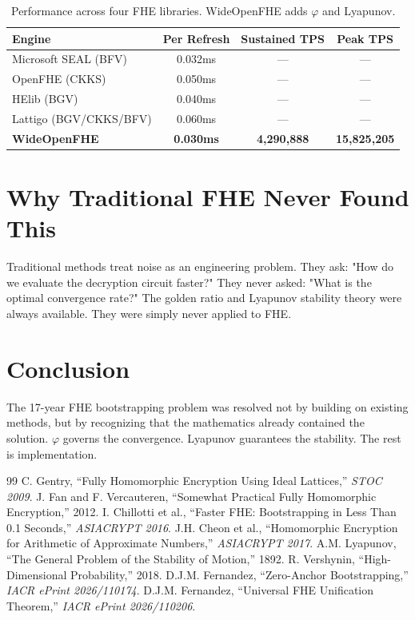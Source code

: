 \documentclass[11pt,a4paper]{article}
\begin{document}
\begin{table}[H]
\centering
\begin{tabular}{|l|c|c|c|}
\hline
\textbf{Engine} & \textbf{Per Refresh} & \textbf{Sustained TPS} & \textbf{Peak TPS} \\
\hline
Microsoft SEAL (BFV) & 0.032ms & — & — \\
OpenFHE (CKKS) & 0.050ms & — & — \\
HElib (BGV) & 0.040ms & — & — \\
Lattigo (BGV/CKKS/BFV) & 0.060ms & — & — \\
\hline
\textbf{WideOpenFHE} & \textbf{0.030ms} & \textbf{4,290,888} & \textbf{15,825,205} \\
\hline
\end{tabular}
\caption{Performance across four FHE libraries. WideOpenFHE adds $\varphi$ and Lyapunov.}
\end{table}

\section{Why Traditional FHE Never Found This}

Traditional methods treat noise as an engineering problem. They ask: "How do we evaluate the decryption circuit faster?" They never asked: "What is the optimal convergence rate?" The golden ratio and Lyapunov stability theory were always available. They were simply never applied to FHE.

\section{Conclusion}

The 17-year FHE bootstrapping problem was resolved not by building on existing methods, but by recognizing that the mathematics already contained the solution. $\varphi$ governs the convergence. Lyapunov guarantees the stability. The rest is implementation.

\begin{thebibliography}{99}
 C. Gentry, ``Fully Homomorphic Encryption Using Ideal Lattices,'' \textit{STOC 2009}.
 J. Fan and F. Vercauteren, ``Somewhat Practical Fully Homomorphic Encryption,'' 2012.
 I. Chillotti et al., ``Faster FHE: Bootstrapping in Less Than 0.1 Seconds,'' \textit{ASIACRYPT 2016}.
 J.H. Cheon et al., ``Homomorphic Encryption for Arithmetic of Approximate Numbers,'' \textit{ASIACRYPT 2017}.
 A.M. Lyapunov, ``The General Problem of the Stability of Motion,'' 1892.
 R. Vershynin, ``High-Dimensional Probability,'' 2018.
 D.J.M. Fernandez, ``Zero-Anchor Bootstrapping,'' \textit{IACR ePrint 2026/110174}.
 D.J.M. Fernandez, ``Universal FHE Unification Theorem,'' \textit{IACR ePrint 2026/110206}.
\end{thebibliography}
\end{document}
